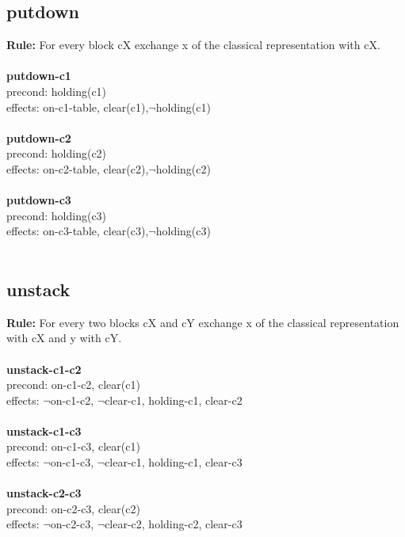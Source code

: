 \documentclass[paper=a4, fontsize=11pt]{scrartcl} %
\numberwithin{equation}{section} %
\numberwithin{figure}{section} %
\numberwithin{table}{section} %
\begin{document}
\subsection{putdown}
\textbf{Rule:} For every block cX exchange x of the classical representation with cX.\\\\

\textbf{putdown-c1}\\
precond: holding(c1)\\
effects: on-c1-table, clear(c1),$\lnot$holding(c1)\\\\

\textbf{putdown-c2}\\
precond: holding(c2)\\
effects: on-c2-table, clear(c2),$\lnot$holding(c2)\\\\

\textbf{putdown-c3}\\
precond: holding(c3)\\
effects: on-c3-table, clear(c3),$\lnot$holding(c3)\\\\

\subsection{unstack}
\textbf{Rule:} For every two blocks cX and cY exchange x of the classical representation with cX and y with cY.\\\\

\textbf{unstack-c1-c2}\\
precond: on-c1-c2, clear(c1)\\
effects: $\lnot$on-c1-c2, $\lnot$clear-c1, holding-c1, clear-c2\\\\

\textbf{unstack-c1-c3}\\
precond: on-c1-c3, clear(c1)\\
effects: $\lnot$on-c1-c3, $\lnot$clear-c1, holding-c1, clear-c3\\\\

\textbf{unstack-c2-c3}\\
precond: on-c2-c3, clear(c2)\\
effects: $\lnot$on-c2-c3, $\lnot$clear-c2, holding-c2, clear-c3\\\\
\end{document}
